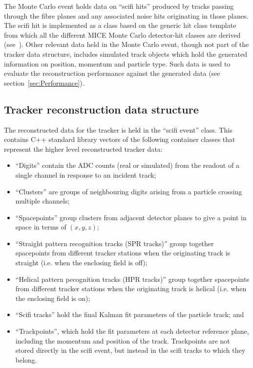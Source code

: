 The Monte Carlo event holds data on ``scifi hits'' produced by tracks passing through the fibre planes and any associated noise hits originating in those planes. The scifi hit is implemented as a class based on the generic hit class template from which all the different MICE Monte Carlo detector-hit classes are derived (see~\cite{MausPaper}).  Other relevant data held in the Monte Carlo event, though not part of the tracker data structure, includes simulated track objects which hold the generated information on position, momentum and particle type.  Such data is used to evaluate the reconstruction performance against the generated data (see section~\ref{sec:Performance}).

\subsection{Tracker reconstruction data structure}
\label{subsec:TrackerReconDataStructure}
The reconstructed data for the tracker is held in the ``scifi event'' class.  This contains C++ standard library vectors of the following container classes that represent the higher level reconstructed tracker data:

\begin{itemize}
  \item ``Digits'' contain the ADC counts (real or simulated) from the readout of a single channel in response to an incident track;
  \item ``Clusters'' are groups of neighbouring digits arising from a particle crossing multiple channels;
  \item ``Spacepoints'' group clusters from adjacent detector planes to give a point in space in terms of $(x, y, z)$;
  \item ``Straight pattern recognition tracks (SPR tracks)'' group together spacepoints from different tracker stations when the originating track is straight (i.e. when the enclosing field is off); %
  \item ``Helical pattern pecognition tracks (HPR tracks)'' group together spacepoints from different tracker stations when the originating track is helical (i.e. when the enclosing field is on); %
  \item ``Scifi tracks'' hold the final Kalman fit parameters of the particle track; and
  \item ``Trackpoints'', which hold the fit parameters at each detector reference plane, including the momentum and position of the track. Trackpoints are not stored directly in the scifi event, but instead in the scifi tracks to which they belong.
\end{itemize}

